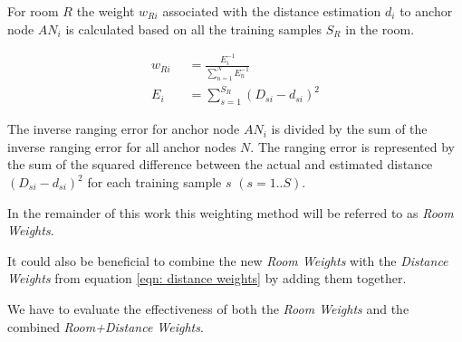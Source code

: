 For room $R$ the weight $w_{Ri}$ associated with the distance estimation $d_i$ to anchor node $AN_i$ is calculated based on all the training samples $S_R$ in the room.

\begin{equation}
\begin{split}
w_{Ri}\;\; & =\frac{E_i^{-1}}{\sum_{n=1}^{N}{E_n^{-1}}}\\
E_i\;\; & = \sum_{s=1}^{S_R}{(D_{si}-d_{si})^2}
\end{split}
\label{eqn: Room Weights}
\end{equation}

The inverse ranging error for anchor node $AN_i$ is divided by the sum of the inverse ranging error for all anchor nodes $N$. The ranging error is represented by the sum of the squared difference between the actual and estimated distance $(D_{si}-d_{si})^2$ for each training sample $s$ $(s=1..S)$.

In the remainder of this work this weighting method will be referred to as \emph{Room Weights}.

It could also be beneficial to combine the new \emph{Room Weights} with the \emph{Distance Weights} from equation \ref{eqn: distance weights} by adding them together.


We have to evaluate the effectiveness of both the \emph{Room Weights} and the combined \emph{Room+Distance Weights}.
